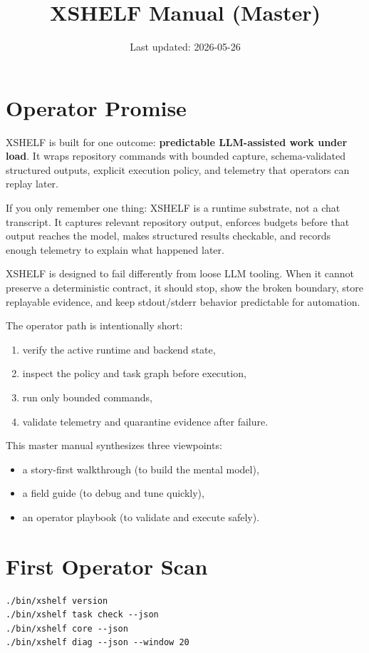 \documentclass[11pt]{article}
\title{XSHELF Manual (Master)}
\author{}
\date{Last updated: 2026-05-26}
\begin{document}
\maketitle
\vspace{-0.6em}

\section*{Operator Promise}
XSHELF is built for one outcome: \textbf{predictable LLM-assisted work under load}.
It wraps repository commands with bounded capture, schema-validated structured outputs,
explicit execution policy, and telemetry that operators can replay later.

If you only remember one thing: XSHELF is a runtime substrate, not a chat transcript.
It captures relevant repository output, enforces budgets before that output reaches the model,
makes structured results checkable, and records enough telemetry to explain what happened later.

XSHELF is designed to fail differently from loose LLM tooling. When it cannot preserve a
deterministic contract, it should stop, show the broken boundary, store replayable evidence,
and keep stdout/stderr behavior predictable for automation.

The operator path is intentionally short:
\begin{enumerate}
  \item verify the active runtime and backend state,
  \item inspect the policy and task graph before execution,
  \item run only bounded commands,
  \item validate telemetry and quarantine evidence after failure.
\end{enumerate}

This master manual synthesizes three viewpoints:
\begin{itemize}
  \item a story-first walkthrough (to build the mental model),
  \item a field guide (to debug and tune quickly),
  \item an operator playbook (to validate and execute safely).
\end{itemize}

\section*{First Operator Scan}
\begin{lstlisting}[style=cx]
./bin/xshelf version
./bin/xshelf task check --json
./bin/xshelf core --json
./bin/xshelf diag --json --window 20
\end{lstlisting}
\end{document}
